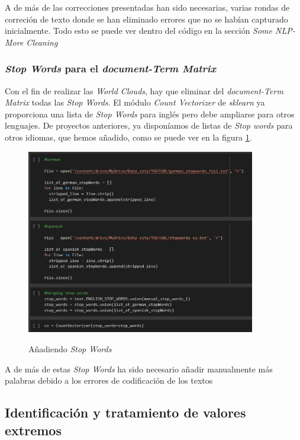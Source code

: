 \documentclass[a4paper,12pt]{article}
\begin{document}
A de m\'as de las correcciones presentadas han sido necesarias, varias rondas de correci\'on de texto donde se han eliminado errores que no se hab\'ian capturado inicialmente. Todo esto se puede ver dentro del c\'odigo en la secci\'on {\itshape Some NLP-More Cleaning}

\subsubsection{{\itshape Stop Words} para el {\itshape document-Term Matrix}}

Con el fin de realizar las {\itshape World Clouds}, hay que eliminar del {\itshape document-Term Matrix} todas las {\itshape Stop Words}. El m\'odulo {\itshape Count Vectorizer} de {\itshape sklearn} ya proporciona una lista de {\itshape Stop Words} para ingl\'es pero debe ampliarse para otros lenguajes. De proyectos anteriores, ya dispon\'iamos de listas de {\itshape Stop words} para otros idiomas, que hemos a\~nadido, como se puede ver en la figura \ref{fig:stop}.

\begin{figure}[h!]
\centering
\includegraphics[width=10cm]{Stop_words.JPG}\\
\caption{A\~nadiendo {\itshape Stop Words}}
\label{fig:stop}
\end{figure}

A de m\'as de estas {\itshape Stop Words} ha sido necesario a\~nadir manualmente m\'as palabras debido a los errores de codificaci\'on de los textos

\subsection{Identificaci\'on y tratamiento de valores extremos}
\end{document}

